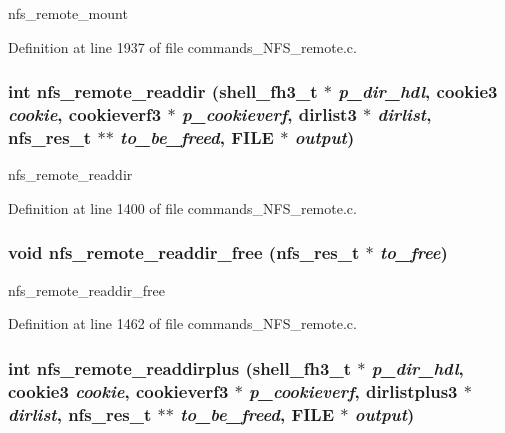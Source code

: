 nfs\_\-remote\_\-mount 

Definition at line 1937 of file commands\_\-NFS\_\-remote.c.
\subsubsection[{nfs\_\-remote\_\-readdir}]{\setlength{\rightskip}{0pt plus 5cm}int nfs\_\-remote\_\-readdir ({\bf shell\_\-fh3\_\-t} $\ast$ {\em p\_\-dir\_\-hdl}, \/  cookie3 {\em cookie}, \/  cookieverf3 $\ast$ {\em p\_\-cookieverf}, \/  dirlist3 $\ast$ {\em dirlist}, \/  nfs\_\-res\_\-t $\ast$$\ast$ {\em to\_\-be\_\-freed}, \/  FILE $\ast$ {\em output})}\label{commands__NFS__remote_8c_61b358c4ec7ddad456f18ca5906c51b6}


nfs\_\-remote\_\-readdir 

Definition at line 1400 of file commands\_\-NFS\_\-remote.c.
\subsubsection[{nfs\_\-remote\_\-readdir\_\-free}]{\setlength{\rightskip}{0pt plus 5cm}void nfs\_\-remote\_\-readdir\_\-free (nfs\_\-res\_\-t $\ast$ {\em to\_\-free})}\label{commands__NFS__remote_8c_4dbe1f73ed1f0853b24498fc8158549e}


nfs\_\-remote\_\-readdir\_\-free 

Definition at line 1462 of file commands\_\-NFS\_\-remote.c.
\subsubsection[{nfs\_\-remote\_\-readdirplus}]{\setlength{\rightskip}{0pt plus 5cm}int nfs\_\-remote\_\-readdirplus ({\bf shell\_\-fh3\_\-t} $\ast$ {\em p\_\-dir\_\-hdl}, \/  cookie3 {\em cookie}, \/  cookieverf3 $\ast$ {\em p\_\-cookieverf}, \/  dirlistplus3 $\ast$ {\em dirlist}, \/  nfs\_\-res\_\-t $\ast$$\ast$ {\em to\_\-be\_\-freed}, \/  FILE $\ast$ {\em output})}\label{commands__NFS__remote_8c_995a52fba27ee2794b8a5c73e32b50d4}


